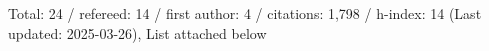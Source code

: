 Total: 24 / refereed: 14 / first author: 4 / citations: 1,798 / h-index: 14 (Last updated: 2025-03-26), List attached below
